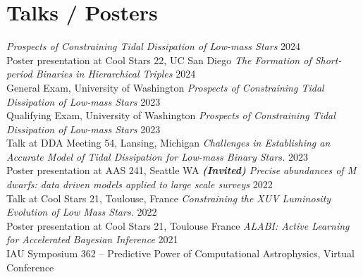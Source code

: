 \documentclass[a4,11pt]{article}
\begin{document}
\section{Talks / Posters}

\textit{Prospects of Constraining Tidal Dissipation of Low-mass Stars} \hfill 2024 \\
Poster presentation at Cool Stars 22, UC San Diego  \vspace{.2cm} \newline
\textit{The Formation of Short-period Binaries in Hierarchical Triples} \hfill 2024 \\
General Exam, University of Washington  \vspace{.2cm} \newline
\textit{Prospects of Constraining Tidal Dissipation of Low-mass Stars} \hfill 2023 \\
Qualifying Exam, University of Washington  \vspace{.2cm} \newline
\textit{Prospects of Constraining Tidal Dissipation of Low-mass Stars} \hfill 2023 \\
Talk at DDA Meeting 54, Lansing, Michigan  \vspace{.2cm} \newline
\textsl{Challenges in Establishing an Accurate Model of Tidal Dissipation for Low-mass Binary Stars.} \hfill 2023 \\ Poster presentation at AAS 241, Seattle WA  \vspace{.2cm} \newline
\textit{\textbf{(Invited)} Precise abundances of M dwarfs: data driven models applied to large scale surveys} \hfill 2022 \\
Talk at Cool Stars 21, Toulouse, France  \vspace{.2cm} \newline
\textsl{Constraining the XUV Luminosity Evolution of Low Mass Stars.} \hfill 2022 \\
Poster presentation at Cool Stars 21, Toulouse France \vspace{.2cm} \newline
\textit{ALABI: Active Learning for Accelerated Bayesian Inference} \hfill 2021 \\
IAU Symposium 362 -- Predictive Power of Computational Astrophysics, Virtual Conference \vspace{.2cm} \newline
\end{document}
